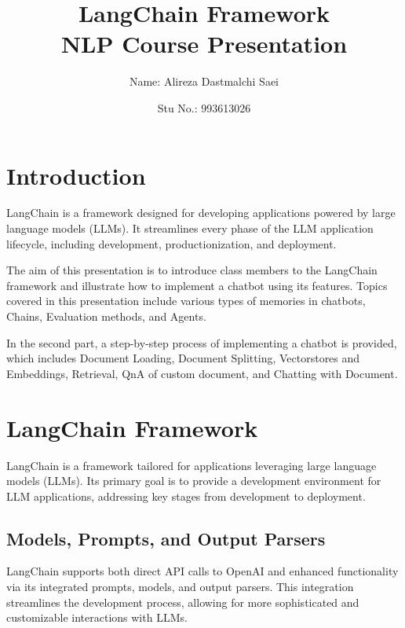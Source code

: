 \documentclass{article}
\title{\textbf{\Huge LangChain Framework} \\ NLP Course Presentation }
\author{Name: Alireza Dastmalchi Saei}
\date{Stu No.: 993613026}
\begin{document}
\maketitle

\pagebreak

\tableofcontents

\pagebreak


\section{Introduction}

LangChain is a framework designed for developing applications powered by large language models (LLMs). It streamlines every phase of the LLM application lifecycle, including development, productionization, and deployment.

The aim of this presentation is to introduce class members to the LangChain framework and illustrate how to implement a chatbot using its features. Topics covered in this presentation include various types of memories in chatbots, Chains, Evaluation methods, and Agents.

In the second part, a step-by-step process of implementing a chatbot is provided, which includes Document Loading, Document Splitting, Vectorstores and Embeddings, Retrieval, QnA of custom document, and Chatting with Document.

\vspace{1cm}


\section{LangChain Framework}

LangChain is a framework tailored for applications leveraging large language models (LLMs). Its primary goal is to provide a development environment for LLM applications, addressing key stages from development to deployment.

\subsection{Models, Prompts, and Output Parsers}

LangChain supports both direct API calls to OpenAI and enhanced functionality via its integrated prompts, models, and output parsers. This integration streamlines the development process, allowing for more sophisticated and customizable interactions with LLMs.
\end{document}
